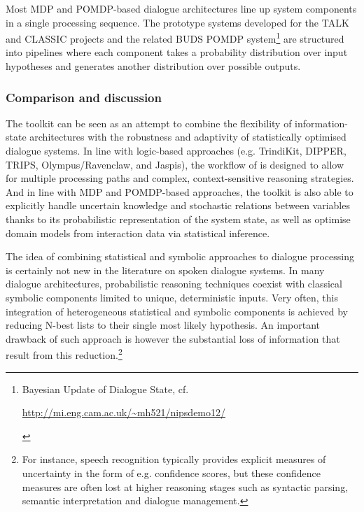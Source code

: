 Most MDP and POMDP-based dialogue architectures line up system components in a single processing sequence. The prototype systems developed for the TALK and CLASSIC projects \citep{Henderson:2008,Lemon:2012} and the related BUDS POMDP system\footnote{Bayesian Update of Dialogue State, cf. \begin{scriptsize}\url{http://mi.eng.cam.ac.uk/~mh521/nipsdemo12/}\end{scriptsize}} are structured into pipelines where each component takes a probability distribution over input hypotheses and generates another distribution over possible outputs.  



\subsubsection*{Comparison and discussion}

The \opendial toolkit can be seen as an attempt to combine the flexibility of information-state architectures with the robustness and adaptivity of statistically optimised dialogue systems.  In line with logic-based approaches (e.g. TrindiKit, DIPPER, TRIPS, Olympus/Ravenclaw, and Jaspis), the workflow of \opendial is designed to allow for multiple processing paths and complex, context-sensitive reasoning strategies.  And in line with MDP and POMDP-based approaches, the toolkit is also able to explicitly handle uncertain knowledge and stochastic relations between variables thanks to its probabilistic representation of the system state, as well as optimise domain models from interaction data via statistical inference.  

The idea of combining statistical and symbolic approaches to dialogue processing is certainly not new in the literature on spoken dialogue systems.  In many dialogue architectures, probabilistic reasoning techniques coexist with classical symbolic components limited to unique, deterministic inputs. Very often, this integration of heterogeneous statistical and symbolic components is achieved by reducing N-best lists to their single most likely hypothesis. An important drawback of such approach is however the substantial loss of information that result from this reduction.\footnote{For instance, speech recognition typically provides explicit measures of uncertainty in the form of e.g. confidence scores, but these confidence measures are often lost at higher reasoning stages such as syntactic parsing, semantic interpretation and dialogue management. }

